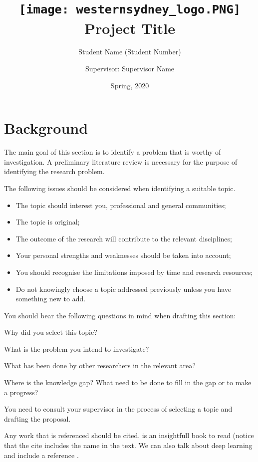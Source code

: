 \documentclass[11pt,a4paper]{scrartcl}
\title{
\texttt{[image: westernsydney\_logo.PNG]}\\
Project Title}
\author{Student Name (Student Number)}
\affil{Project proposal for 300597 Master Project 1}
\author{Supervisor: Supervisor Name}
\affil{School of Computer, Data and Mathematical Sciences, \\ Western Sydney University}
\date{Spring, 2020}
\begin{document}
\maketitle



\section{Background}


The main goal of this section is to identify a problem that is worthy of
investigation. A preliminary literature review is necessary for the
purpose of identifying the research problem.

The following issues should be considered when identifying a suitable
topic.

\begin{itemize}
\item The topic should interest you, professional and general communities;
\item The topic is original;
\item The outcome of the research will contribute to the relevant
  disciplines;
\item Your personal strengths and weaknesses should be taken into account;
\item You should recognise the limitations imposed by time and research
  resources;
\item Do not knowingly choose a topic addressed previously unless you have
  something new to add.
\end{itemize}

You should bear the following questions in mind when drafting this
section:

Why did you select this topic?

What is the problem you intend to investigate?

What has been done by other researchers in the relevant area?

Where is the knowledge gap? What need to be done to fill in the gap or
to make a progress?

You need to consult your supervisor in the process of selecting a topic
and drafting the proposal.

Any work that is referenced should be
cited. \citet{friedman2001elements} is an insightfull book to read
(notice that the cite includes the name in the text. We can also talk
about deep learning and include a reference
\citep{goodfellow2016deep}.
\end{document}

